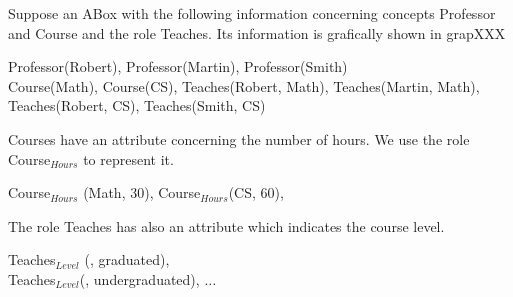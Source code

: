 \begin{example}
Suppose an ABox with the following information concerning concepts Professor  and Course and the role Teaches.
Its information is grafically shown in grapXXX

\begin{center}
Professor(Robert), Professor(Martin), Professor(Smith)\\
Course(Math), Course(CS),
Teaches(Robert, Math),  Teaches(Martin, Math), Teaches(Robert, CS),  Teaches(Smith, CS)
\end{center}

Courses have an attribute concerning the number of hours.
We use the role Course$_{Hours}$  to represent it.

\begin{center}
 Course$_{Hours}$ (Math, 30),  Course$_{Hours}$(CS, 60),
\end{center}

The role Teaches has also an attribute which indicates the course level.

\begin{center}
Teaches$_{Level}$ (, graduated), \\
Teaches$_{Level}$(, undergraduated), $\dots$
\end{center}
\end{example}
